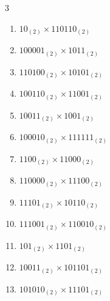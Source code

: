 \begin{multicols}{3}
\begin{enumerate}
  \item $10_{(2)} \times 110110_{(2)}$


  \item $100001_{(2)} \times 1011_{(2)}$


  \item $110100_{(2)} \times 10101_{(2)}$


  \item $100110_{(2)} \times 11001_{(2)}$


  \item $10011_{(2)} \times 1001_{(2)}$


\columnbreak %

  \item $100010_{(2)} \times 111111_{(2)}$


  \item $1100_{(2)} \times 11000_{(2)}$


  \item $110000_{(2)} \times 11100_{(2)}$


  \item $11101_{(2)} \times 10110_{(2)}$


  \item $111001_{(2)} \times 110010_{(2)}$


\columnbreak %

  \item $101_{(2)} \times 1101_{(2)}$


  \item $10011_{(2)} \times 101101_{(2)}$


  \item $101010_{(2)} \times 11101_{(2)}$


\end{enumerate}
\end{multicols}
